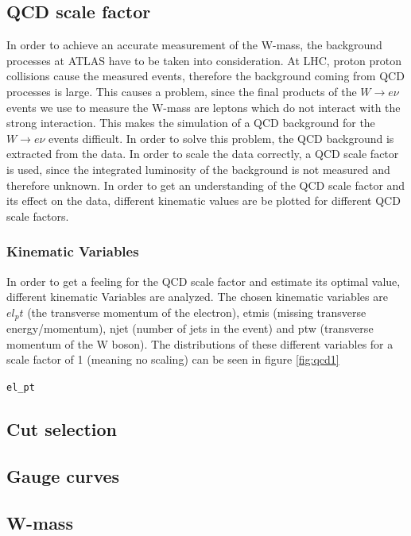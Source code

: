\subsection{QCD scale factor}
In order to achieve an accurate measurement of the W-mass, the background processes at ATLAS have to be taken into consideration.
At LHC, proton proton collisions cause the measured events, therefore the background coming from QCD processes is large. This causes a problem,
since the final products of the $W \rightarrow e\nu$ events we use to measure the W-mass are leptons which do not interact with the strong interaction.
This makes the simulation of a QCD background for the $W \rightarrow e\nu$ events difficult. In order to solve this problem, the QCD background is extracted
from the data. In order to scale the data correctly, a QCD scale factor is used, since the integrated luminosity of the background is not measured and therefore
unknown. In order to get an understanding of the QCD scale factor and its effect on the data, different kinematic values are be plotted for different 
QCD scale factors.

\subsubsection{Kinematic Variables}
In order to get a feeling for the QCD scale factor and estimate its optimal value, different kinematic Variables are analyzed.
The chosen kinematic variables are $el_pt$ (the transverse momentum of the electron), etmis (missing transverse energy/momentum),
njet (number of jets in the event) and ptw (transverse momentum of the W boson). The distributions of these different variables
for a scale factor of 1 (meaning no scaling) can be seen in figure \ref{fig:qcd1}

\texttt{el\_pt}
\subsection{Cut selection}

\subsection{Gauge curves}

\subsection{W-mass }